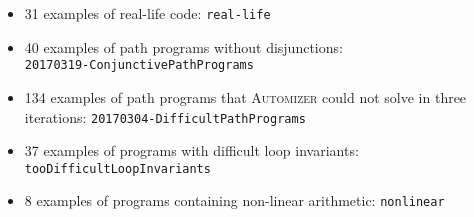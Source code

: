 \documentclass[11pt, a4paper, BCOR=10mm, ngerman]{scrbook}
\begin{document}
\begin{itemize}
\item 31 examples of real-life code: \texttt{real-life}

\item 40 examples of path programs without disjunctions: \\ \texttt{20170319-ConjunctivePathPrograms}

\item 134 examples of path programs that \textsc{Automizer} could not solve in three iterations: \texttt{20170304-DifficultPathPrograms}

\item 37 examples of programs with difficult loop invariants: \\ \texttt{tooDifficultLoopInvariants}

\item 8 examples of programs containing non-linear arithmetic: \texttt{nonlinear}
\end{itemize}

\vspace*{3cm}
\end{document}
